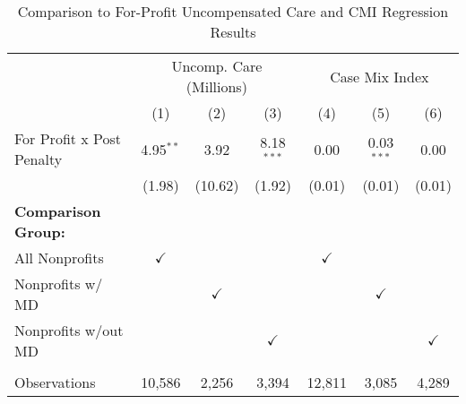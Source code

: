 \begin{table}[htbp]
   \caption{\label{tab:forprofit_uncomp_CMI_fullsample} Comparison to For-Profit Uncompensated Care and CMI Regression Results}
   \bigskip
   \centering
   \begin{tabular}{lcccccc}
      \toprule
       & \multicolumn{3}{c}{Uncomp. Care (Millions)} & \multicolumn{3}{c}{Case Mix Index}\\
                                  & (1)           & (2)           & (3)           & (4)           & (5)           & (6)\\  
      \midrule 
      For Profit x Post Penalty   & 4.95$^{**}$   & 3.92          & 8.18$^{***}$  & 0.00          & 0.03$^{***}$  & 0.00\\   
                                  & (1.98)        & (10.62)       & (1.92)        & (0.01)        & (0.01)        & (0.01)\\   
      \textbf{Comparison Group:}  &               &               &               &               &               & \\  
      All Nonprofits              & $\checkmark$  &               &               & $\checkmark$  &               & \\  
      Nonprofits w/ MD            &               & $\checkmark$  &               &               & $\checkmark$  & \\  
      Nonprofits w/out MD         &               &               & $\checkmark$  &               &               & $\checkmark$\\   
       \\
      Observations                & 10,586        & 2,256         & 3,394         & 12,811        & 3,085         & 4,289\\  
      \bottomrule
   \end{tabular}
\end{table}